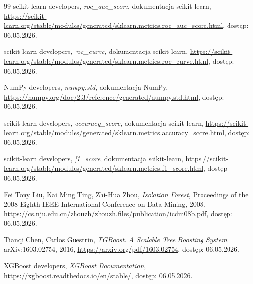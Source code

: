 \begin {thebibliography}{99}
scikit-learn developers, {\it roc\_auc\_score}, dokumentacja scikit-learn, \newline
\url{https://scikit-learn.org/stable/modules/generated/sklearn.metrics.roc_auc_score.html}, dostęp: 06.05.2026.

scikit-learn developers, {\it roc\_curve}, dokumentacja scikit-learn, \newline
\url{https://scikit-learn.org/stable/modules/generated/sklearn.metrics.roc_curve.html}, dostęp: 06.05.2026.

NumPy developers, {\it numpy.std}, dokumentacja NumPy, \newline
\url{https://numpy.org/doc/2.3/reference/generated/numpy.std.html}, dostęp: 06.05.2026.

scikit-learn developers, {\it accuracy\_score}, dokumentacja scikit-learn, \newline
\url{https://scikit-learn.org/stable/modules/generated/sklearn.metrics.accuracy_score.html}, dostęp: 06.05.2026.

scikit-learn developers, {\it f1\_score}, dokumentacja scikit-learn, \newline
\url{https://scikit-learn.org/stable/modules/generated/sklearn.metrics.f1_score.html}, dostęp: 06.05.2026.

Fei Tony Liu, Kai Ming Ting, Zhi-Hua Zhou, {\it Isolation Forest}, \newline
Proceedings of the 2008 Eighth IEEE International Conference on Data Mining, 2008, \newline
\url{https://cs.nju.edu.cn/zhouzh/zhouzh.files/publication/icdm08b.pdf}, dostęp: 06.05.2026.

Tianqi Chen, Carlos Guestrin, {\it XGBoost: A Scalable Tree Boosting System}, \newline
arXiv:1603.02754, 2016, \newline
\url{https://arxiv.org/pdf/1603.02754}, dostęp: 06.05.2026.

XGBoost developers, {\it XGBoost Documentation}, \newline
\url{https://xgboost.readthedocs.io/en/stable/}, dostęp: 06.05.2026.

\end{thebibliography}
